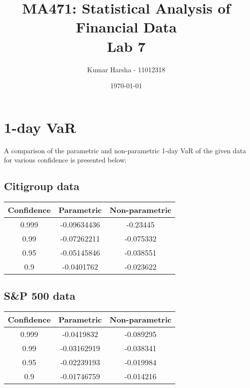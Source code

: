 \documentclass[12pt]{article}
\begin{document}
\title{MA471: Statistical Analysis of Financial Data\\Lab 7}
\author{Kumar Harsha - 11012318}
\date{\today}
\maketitle

\tableofcontents
\newpage

\section{1-day VaR}
A comparison of the parametric and non-parametric 1-day VaR of the given data for various confidence is presented below:
  \subsection*{Citigroup data}
  \begin{center}
    \begin{tabular}{c|c|c}
      Confidence &Parametric &Non-parametric \\ \hline 
      0.999 &-0.09634436 &-0.23445 \\
      0.99 &-0.07262211 &-0.075332 \\
      0.95 &-0.05145846 &-0.038551 \\
      0.9 &-0.0401762 &-0.023622 \\ \hline
    \end{tabular}
  \end{center}
  \subsection*{S\&P 500 data}
  \begin{center}
    \begin{tabular}{c|c|c}
      Confidence &Parametric &Non-parametric \\ \hline 
      0.999 &-0.0419832 &-0.089295 \\
      0.99 &-0.03162919 &-0.038341 \\
      0.95 &-0.02239193 &-0.019984 \\
      0.9 &-0.01746759 &-0.014216 \\ \hline
    \end{tabular}
  \end{center}
\end{document}

